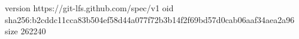 version https://git-lfs.github.com/spec/v1
oid sha256:b2cddc11cca83b504ef58d44a077f72b3b14f2f69bd57d0cab06aaf34aea2a96
size 262240
